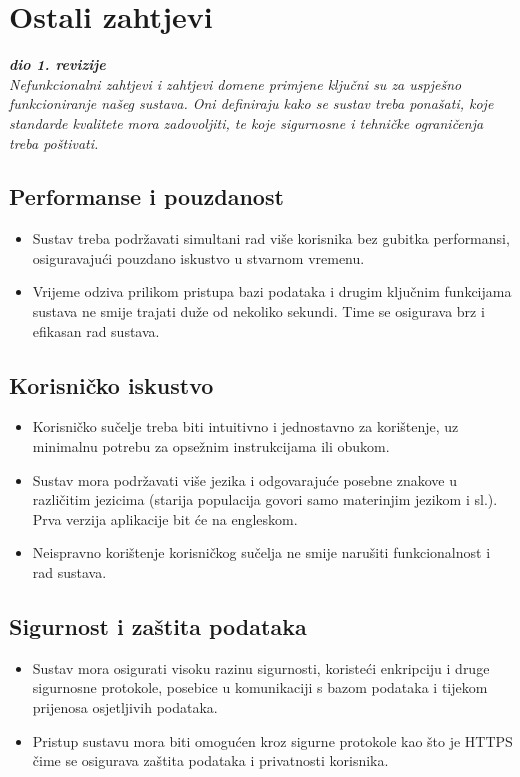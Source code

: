 \documentclass[12pt]{report}
\begin{document}
\section{Ostali zahtjevi}


\textbf{\textit{dio 1. revizije}}\\

\textit{Nefunkcionalni zahtjevi i zahtjevi domene primjene ključni su za uspješno funkcioniranje našeg sustava. Oni definiraju kako se sustav treba ponašati, koje standarde kvalitete mora zadovoljiti, te koje sigurnosne i tehničke ograničenja treba poštivati.}

\subsection*{Performanse i pouzdanost}
\begin{itemize}
    \item Sustav treba podržavati simultani rad više korisnika bez gubitka performansi, osiguravajući pouzdano iskustvo u stvarnom vremenu.
    \item Vrijeme odziva prilikom pristupa bazi podataka i drugim ključnim funkcijama sustava ne smije trajati duže od nekoliko sekundi. Time se osigurava brz i efikasan rad sustava.
\end{itemize}

\subsection*{Korisničko iskustvo}
\begin{itemize}
    \item Korisničko sučelje treba biti intuitivno i jednostavno za korištenje, uz minimalnu potrebu za opsežnim instrukcijama ili obukom.
    \item Sustav mora podržavati više jezika i odgovarajuće posebne znakove u različitim jezicima (starija populacija govori samo materinjim jezikom i sl.). Prva verzija aplikacije bit će na engleskom. 
    \item Neispravno korištenje korisničkog sučelja ne smije narušiti funkcionalnost i rad sustava.
\end{itemize}

\subsection*{Sigurnost i zaštita podataka}
\begin{itemize}
    \item Sustav mora osigurati visoku razinu sigurnosti, koristeći enkripciju i druge sigurnosne protokole, posebice u komunikaciji s bazom podataka i tijekom prijenosa osjetljivih podataka.
    \item Pristup sustavu mora biti omogućen kroz sigurne protokole kao što je HTTPS čime se osigurava zaštita podataka i privatnosti korisnika.
\end{itemize}
\end{document}
